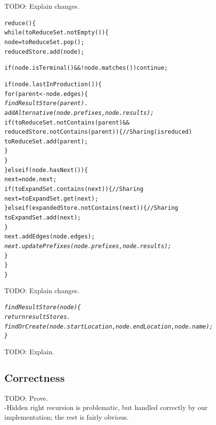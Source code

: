 \documentclass[a4paper,10pt]{article}
\begin{document}
TODO: Explain changes.

{\small
\begin{alltt}
reduce()\{
  while(toReduceSet.notEmpty())\{
    node = toReduceSet.pop();
    reducedStore.add(node);
    
    if(node.isTerminal() && !node.matches()) continue;
    
    if(node.lastInProduction())\{
      for(parent <- node.edges)\{\textit{
        findResultStore(parent).
            addAlternative(node.prefixes, node.results);}
        if(toReduceSet.notContains(parent) &&
            reducedStore.notContains(parent))\{ // Sharing (is reduced)
          toReduceSet.add(parent);
        \}
      \}
    \}else if(node.hasNext())\{
      next = node.next;
      if(toExpandSet.contains(next))\{ // Sharing
        next = toExpandSet.get(next);
      \}else if(expandedStore.notContains(next))\{ // Sharing
        toExpandSet.add(next);
      \}
      next.addEdges(node.edges);\textit{
      next.updatePrefixes(node.prefixes, node.results);}
    \}
  \}
\}
\end{alltt}
}

TODO: Explain changes.

{\small
\begin{alltt}
\textit{findResultStore(node)\{
  return resultStores.
    findOrCreate(node.startLocation, node.endLocation, node.name);
\}}
\end{alltt}
}

TODO: Explain.

\subsection{Correctness}

TODO: Prove.\\
-Hidden right recursion is problematic, but handled correctly by our implementation; the rest is fairly obvious.
\end{document}
